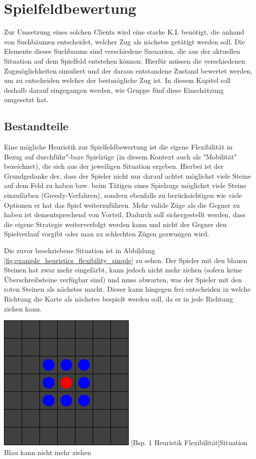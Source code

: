\documentclass[12pt,a4paper,bibliography=totocnumbered,listof=totocnumbered]{article}
\begin{document}
\section{Spielfeldbewertung}
Zur Umsetzung eines solchen Clients wird eine starke K.I. benötigt, die anhand von Suchbäumen entscheidet, welcher Zug als nächstes getätigt werden soll. Die Elemente dieses Suchbaums sind verschiedene Szenarien, die aus der aktuellen Situation auf dem Spielfeld entstehen können. Hierfür müssen die verschiedenen Zugmöglichkeiten simuliert und der daraus entstandene Zustand bewertet werden, um zu entscheiden welcher der bestmögliche Zug ist. 
In diesem Kapitel soll deshalb darauf eingegangen werden, wie Gruppe fünf diese Einschätzung umgesetzt hat.

\subsection{Bestandteile}\label{kap:Heuristik_Beschreibung}
Eine mögliche Heuristik zur Spielfeldbewertung ist die eigene Flexibilität in Bezug auf durchführ"-bare Spielzüge (in diesem Kontext auch als "Mobilität" bezeichnet), die sich aus der jeweiligen Situation ergeben. Hierbei ist der Grundgedanke der, dass der Spieler nicht nur darauf achtet möglichst viele Steine auf dem Feld zu haben bzw. beim Tätigen eines Spielzugs möglichst viele Steine einzufärben (Greedy-Verfahren), sondern ebenfalls zu berücksichtigen wie viele Optionen er hat das Spiel weiterzuführen. Mehr valide Züge als die Gegner zu haben ist dementsprechend von Vorteil. Dadurch soll sichergestellt werden, dass die eigene Strategie weiterverfolgt werden kann und nicht der Gegner den Spielverlauf vorgibt oder man zu \glqq schlechten\grqq{} Zügen gezwungen wird.

Die zuvor beschriebene Situation ist in Abbildung \ref{fig:example_heuristics_flexibility_simple} zu sehen. Der Spieler mit den blauen Steinen hat zwar mehr eingefärbt, kann jedoch nicht mehr ziehen (sofern keine Überschreibsteine verfügbar sind) und muss abwarten, was der Spieler mit den roten Steinen als nächstes macht. Dieser kann hingegen frei entscheiden in welche Richtung die Karte als nächstes bespielt werden soll, da er in jede Richtung ziehen kann.

\vspace{1em}
\begin{minipage}{\linewidth}
	\centering
	\includegraphics[width=0.3\linewidth]{pics/heuristics_flexibility_simple.png}
	[Bsp. 1 Heuristik Flexibilität]{Situation Blau kann nicht mehr ziehen}
	\label{fig:example_heuristics_flexibility_simple}
\end{minipage}
\\
\end{document}
